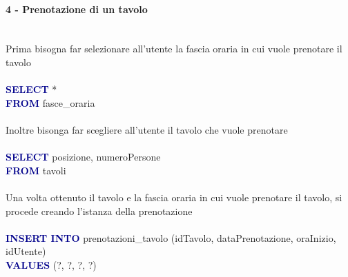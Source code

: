 \documentclass[a4paper,12pt, oneside]{article}
\begin{document}
\paragraph{4 - Prenotazione di un tavolo}
\hphantom{A}\\    %
Prima bisogna far selezionare all'utente la fascia oraria in cui vuole prenotare il tavolo
\\\\
\textcolor{darkBlue}{\textbf{SELECT}} *
\\\textcolor{darkBlue}{\textbf{FROM}} fasce\_oraria
\\\\
Inoltre bisonga far scegliere all'utente il tavolo che vuole prenotare
\\\\
\textcolor{darkBlue}{\textbf{SELECT}} posizione, numeroPersone
\\\textcolor{darkBlue}{\textbf{FROM}} tavoli
\\\\
Una volta ottenuto il tavolo e la fascia oraria in cui vuole prenotare il tavolo, si procede creando l'istanza della prenotazione
\\\\
\textcolor{darkBlue}{\textbf{INSERT INTO}} prenotazioni\_tavolo (idTavolo, dataPrenotazione, oraInizio, idUtente)
\\\textcolor{darkBlue}{\textbf{VALUES}} (?, ?, ?, ?)
\end{document}
